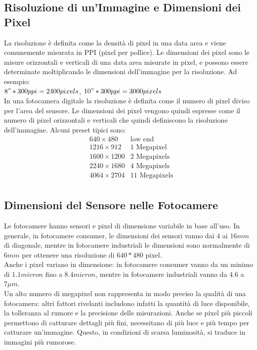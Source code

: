 \documentclass[a4paper,11pt]{article} %
\begin{document}
\newpage

\subsection{Risoluzione di un'Immagine e Dimensioni dei Pixel}
La risoluzione è definita come la densità di pixel in una data area e viene comunemente misurata in PPI (pixel per pollice). Le dimensioni dei pixel sono le misure orizzontali e verticali di una data area misurate in pixel, e possono essere determinate moltiplicando le dimensioni dell'immagine per la risoluzione. Ad esempio:\\
$8" * 300ppi = 2400 pixels$, $10" * 300ppi = 3000 pixels$\\
In una fotocamera digitale la risoluzione è definita come il numero di pixel diviso per l'area del sensore. Le dimensioni dei pixel vengono quindi espresse come il numero di pixel orizzontali e verticali che quindi definiscono la risoluzione dell'immagine. Alcuni preset tipici sono: 
\begin{align*}
    &640 \times 480 & \text{low end} \\
    &1216 \times 912 & \text{1 Megapixel} \\
    &1600 \times 1200 & \text{2 Megapixels} \\
    &2240 \times 1680 & \text{4 Megapixels} \\
    &4064 \times 2704 & \text{11 Megapixels} \\
\end{align*}
\subsection{Dimensioni del Sensore nelle Fotocamere}
Le fotocamere hanno sensori e pixel di dimensione variabile in base all'uso. In generale, in fotocamere consumer, le dimensioni dei sensori vanno dai $4$ ai $16mm$ di diagonale, mentre in fotocamere industriali le dimensioni sono normalmente di $6mm$ per ottenere una risoluzione di $640*480$ pixel.\\ 
Anche i pixel variano in dimensione: in fotocamere consumer vanno da un minimo di $1.1 micron$ fino a $8.4 micron$, mentre in fotocamere industriali vanno da $4.6$ a $7 \mu m$.\\
Un alto numero di megapixel non rappresenta in modo preciso la qualità di una fotocamera: altri fattori rivelanti includono infatti la quantità di luce disponibile, la tolleranza al rumore e la precisione delle misurazioni. Anche se pixel più piccoli permettono di catturare dettagli più fini, necessitano di più luce e più tempo per catturare un'immagine. Questo, in condizioni di scarsa luminosità, si traduce in immagini più rumorose.
\end{document}
